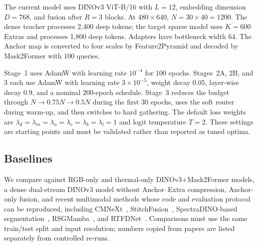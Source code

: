 \documentclass[10pt,twocolumn,letterpaper]{article}
\begin{document}
The current model uses DINOv3 ViT-B/16 with $L=12$, embedding dimension $D=768$, and fusion after $R=3$ blocks.
At $480\times640$, $N=30\times40=1200$.
The dense teacher processes 2,400 deep tokens; the target sparse model uses $K=600$ Extras and processes 1,800 deep tokens.
Adapters have bottleneck width 64.
The Anchor map is converted to four scales by Feature2Pyramid and decoded by Mask2Former with 100 queries.

Stage~1 uses AdamW with learning rate $10^{-4}$ for 100 epochs.
Stages~2A, 2B, and 3 each use AdamW with learning rate $3\times10^{-5}$, weight decay $0.05$, layer-wise decay $0.9$, and a nominal 200-epoch schedule.
Stage~3 reduces the budget through $N\rightarrow0.75N\rightarrow0.5N$ during the first 30 epochs, uses the soft router during warm-up, and then switches to hard gathering.
The default loss weights are $\lambda_d=\lambda_m=\lambda_a=\lambda_c=\lambda_b=\lambda_l=1$ and logit temperature $T=2$.
These settings are starting points and must be validated rather than reported as tuned optima.

\subsection{Baselines}

We compare against RGB-only and thermal-only DINOv3+Mask2Former models, a dense dual-stream DINOv3 model without Anchor--Extra compression, Anchor-only fusion, and recent multimodal methods whose code and evaluation protocol can be reproduced, including CMNeXt~\cite{zhang2023deliver}, StitchFusion~\cite{li2024stitchfusion}, SpectraDINO-based segmentation~\cite{nalcakan2026spectradino}, RSGMamba~\cite{xu2026rsgmamba}, and RTFDNet~\cite{tan2026rtfdnet}.
Comparisons must use the same train/test split and input resolution; numbers copied from papers are listed separately from controlled re-runs.
\end{document}
